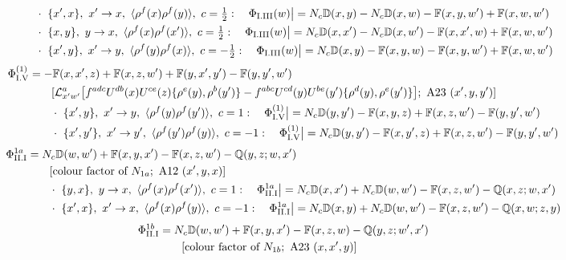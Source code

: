 \documentclass[9pt]{article}
\def\mf#1{\mathbb{#1}}
\numberwithin{equation}{section}
\begin{document}
{\begin{align}
&\qquad\cdot\ \{x',x\},\ x'\to x,\ \langle\rho^{f}(x)\rho^{f}(y)\rangle,\ c=\tfrac{1}{2}:\quad \Phi_{\rm I.III}(w)\big|=N_{c}\mf{D}(x,y)-N_{c}\mf{D}(x,w)-\mf{F}(x,y,w')+\mf{F}(x,w,w')\notag\\
&\qquad\cdot\ \{x,y\},\ y\to x,\ \langle\rho^{f}(x)\rho^{f}(x')\rangle,\ c=\tfrac{1}{2}:\quad \Phi_{\rm I.III}(w)\big|=N_{c}\mf{D}(x,x')-N_{c}\mf{D}(x,w')-\mf{F}(x,x',w)+\mf{F}(x,w,w')\notag\\
&\qquad\cdot\ \{x',y\},\ x'\to y,\ \langle\rho^{f}(y)\rho^{f}(x)\rangle,\ c=-\tfrac{1}{2}:\quad \Phi_{\rm I.III}(w)\big|=N_{c}\mf{D}(x,y)-\mf{F}(x,y,w)-\mf{F}(x,y,w')+\mf{F}(x,w,w')\notag
\end{align}
\begin{align}
\Phi_{\rm I.V}^{(1)}&=-\mf{F}(x,x',z)+\mf{F}(x,z,w')+\mf{F}(y,x',y')-\mf{F}(y,y',w')\notag\\&\qquad[\mathcal{L}^{a}_{x'w'}\big[f^{adc}U^{db}(x)U^{ce}(z)\{\rho^{e}(y),\rho^{b}(y')\}-f^{abc}U^{cd}(y)U^{be}(y')\{\rho^{d}(y),\rho^{e}(y')\}\big];\ \text{A23}\ (x',y,y')]\notag\\
&\qquad\cdot\ \{x',y\},\ x'\to y,\ \langle\rho^{f}(y)\rho^{f}(y')\rangle,\ c=1:\quad \Phi_{\rm I.V}^{(1)}\big|=N_{c}\mf{D}(y,y')-\mf{F}(x,y,z)+\mf{F}(x,z,w')-\mf{F}(y,y',w')\notag\\
&\qquad\cdot\ \{x',y'\},\ x'\to y',\ \langle\rho^{f}(y')\rho^{f}(y)\rangle,\ c=-1:\quad \Phi_{\rm I.V}^{(1)}\big|=N_{c}\mf{D}(y,y')-\mf{F}(x,y',z)+\mf{F}(x,z,w')-\mf{F}(y,y',w')\notag
\end{align}
\begin{align}
\Phi_{\rm II.I}^{1a}&=N_{c}\mf{D}(w,w')+\mf{F}(x,y,x')-\mf{F}(x,z,w')-\mf{Q}(y,z;w,x')\notag\\&\qquad[\text{colour factor of }N_{1a};\ \text{A12}\ (x',y,x)]\notag\\
&\qquad\cdot\ \{y,x\},\ y\to x,\ \langle\rho^{f}(x)\rho^{f}(x')\rangle,\ c=1:\quad \Phi_{\rm II.I}^{1a}\big|=N_{c}\mf{D}(x,x')+N_{c}\mf{D}(w,w')-\mf{F}(x,z,w')-\mf{Q}(x,z;w,x')\notag\\
&\qquad\cdot\ \{x',x\},\ x'\to x,\ \langle\rho^{f}(x)\rho^{f}(y)\rangle,\ c=-1:\quad \Phi_{\rm II.I}^{1a}\big|=N_{c}\mf{D}(x,y)+N_{c}\mf{D}(w,w')-\mf{F}(x,z,w')-\mf{Q}(x,w;z,y)\notag
\end{align}
\begin{align}
\Phi_{\rm II.I}^{1b}&=N_{c}\mf{D}(w,w')+\mf{F}(x,y,x')-\mf{F}(x,z,w)-\mf{Q}(y,z;w',x')\notag\\&\qquad[\text{colour factor of }N_{1b};\ \text{A23}\ (x,x',y)]\notag\\

\end{align}}
\end{document}
